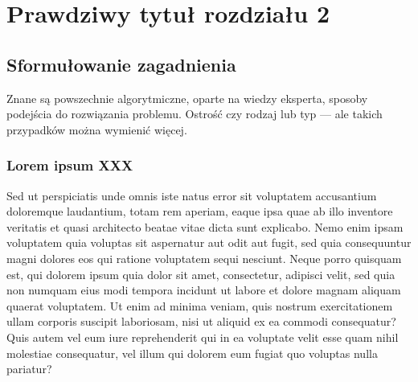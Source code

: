 \chapter{Prawdziwy tytuł rozdziału 2}
\label{metoda_rozdzialu2}

\section{Sformułowanie zagadnienia}

Znane są powszechnie algorytmiczne, oparte na wiedzy eksperta, sposoby podejścia do rozwiązania problemu. Ostrość czy rodzaj lub typ --- ale takich przypadków można wymienić więcej.

\subsection{Lorem ipsum XXX}
\label{podrozdzial-Sed}

Sed ut perspiciatis unde omnis iste natus error sit voluptatem accusantium doloremque laudantium, totam rem aperiam, eaque ipsa quae ab illo inventore veritatis et quasi architecto beatae vitae dicta sunt explicabo. Nemo enim ipsam voluptatem quia voluptas sit aspernatur aut odit aut fugit, sed quia consequuntur magni dolores eos qui ratione voluptatem sequi nesciunt. Neque porro quisquam est, qui dolorem ipsum quia dolor sit amet, consectetur, adipisci velit, sed quia non numquam eius modi tempora incidunt ut labore et dolore magnam aliquam quaerat voluptatem. Ut enim ad minima veniam, quis nostrum exercitationem ullam corporis suscipit laboriosam, nisi ut aliquid ex ea commodi consequatur? Quis autem vel eum iure reprehenderit qui in ea voluptate velit esse quam nihil molestiae consequatur, vel illum qui dolorem eum fugiat quo voluptas nulla pariatur?
